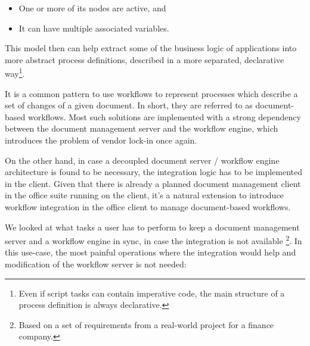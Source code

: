 \begin{itemize}
\item One or more of its nodes are active, and
\item It can have multiple associated variables.
\end{itemize}

This model then can help extract some of the business logic of applications
into more abstract process definitions, described in a more separated,
declarative way\footnote{Even if script tasks can contain imperative code, the
main structure of a process definition is always declarative.}.

It is a common pattern to use workflows to represent processes which describe a
set of changes of a given document. In short, they are referred to as
document-based workflows. Most such solutions are implemented with a strong
dependency between the document management server and the workflow engine,
which introduces the problem of vendor lock-in once again.

On the other hand, in case a decoupled document server / workflow engine
architecture is found to be necessary, the integration logic has to be implemented
in the client. Given that there is already a planned document management client
in the office suite running on the client, it's a natural extension to
introduce workflow integration in the office client to manage document-based
workflows.

We looked at what tasks a user has to perform to keep a document management
server and a workflow engine in sync, in case the integration is not available
\footnote{Based on a set of requirements from a real-world project for a
finance company.}.  In this use-case, the most painful operations where the
integration would help and modification of the workflow server is not needed:

